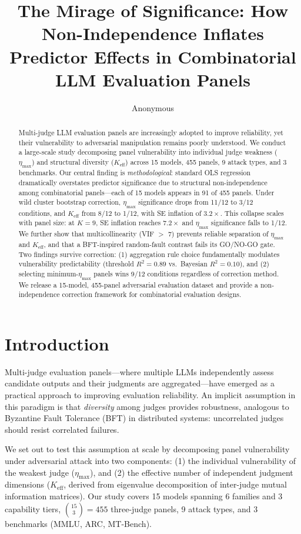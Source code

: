 \documentclass[11pt]{article}
\title{The Mirage of Significance: How Non-Independence Inflates \\Predictor Effects in Combinatorial LLM Evaluation Panels}
\author{Anonymous}
\date{}
\begin{document}
\maketitle

\begin{abstract}
Multi-judge LLM evaluation panels are increasingly adopted to improve reliability, yet their vulnerability to adversarial manipulation remains poorly understood. We conduct a large-scale study decomposing panel vulnerability into individual judge weakness ($\eta_{\max}$) and structural diversity ($K_{\text{eff}}$) across 15 models, 455 panels, 9 attack types, and 3 benchmarks. Our central finding is \emph{methodological}: standard OLS regression dramatically overstates predictor significance due to structural non-independence among combinatorial panels---each of 15 models appears in 91 of 455 panels. Under wild cluster bootstrap correction, $\eta_{\max}$ significance drops from 11/12 to 3/12 conditions, and $K_{\text{eff}}$ from 8/12 to 1/12, with SE inflation of $3.2\times$. This collapse scales with panel size: at $K{=}9$, SE inflation reaches $7.2\times$ and $\eta_{\max}$ significance falls to 1/12. We further show that multicollinearity (VIF $>$ 7) prevents reliable separation of $\eta_{\max}$ and $K_{\text{eff}}$, and that a BFT-inspired random-fault contrast fails its GO/NO-GO gate. Two findings survive correction: (1) aggregation rule choice fundamentally modulates vulnerability predictability (threshold $R^2{=}0.89$ vs.\ Bayesian $R^2{=}0.10$), and (2) selecting minimum-$\eta_{\max}$ panels wins 9/12 conditions regardless of correction method. We release a 15-model, 455-panel adversarial evaluation dataset and provide a non-independence correction framework for combinatorial evaluation designs.
\end{abstract}

\section{Introduction}

Multi-judge evaluation panels---where multiple LLMs independently assess candidate outputs and their judgments are aggregated---have emerged as a practical approach to improving evaluation reliability. An implicit assumption in this paradigm is that \emph{diversity} among judges provides robustness, analogous to Byzantine Fault Tolerance (BFT) in distributed systems: uncorrelated judges should resist correlated failures.

We set out to test this assumption at scale by decomposing panel vulnerability under adversarial attack into two components: (1) the individual vulnerability of the weakest judge ($\eta_{\max}$), and (2) the effective number of independent judgment dimensions ($K_{\text{eff}}$, derived from eigenvalue decomposition of inter-judge mutual information matrices). Our study covers 15 models spanning 6 families and 3 capability tiers, $\binom{15}{3} = 455$ three-judge panels, 9 attack types, and 3 benchmarks (MMLU, ARC, MT-Bench).
\end{document}
